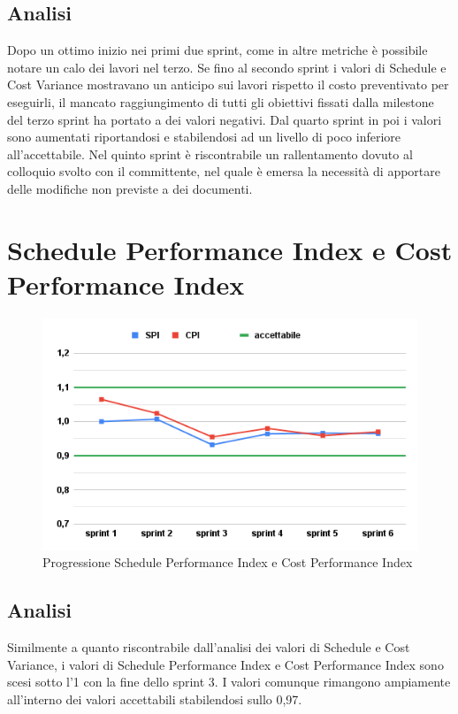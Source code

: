 \subsection{Analisi}
Dopo un ottimo inizio nei primi due sprint, come in altre metriche è possibile notare un calo dei lavori nel terzo. Se fino al secondo sprint i valori di Schedule e Cost Variance mostravano un anticipo sui lavori rispetto il costo preventivato per eseguirli, il mancato raggiungimento di tutti gli obiettivi fissati dalla milestone del terzo sprint ha portato a dei valori negativi. Dal quarto sprint in poi i valori sono aumentati riportandosi e stabilendosi ad un livello di poco inferiore all'accettabile. Nel quinto sprint è riscontrabile un rallentamento dovuto al colloquio svolto con il committente, nel quale è emersa la necessità di apportare delle modifiche non previste a dei documenti.

\section{Schedule Performance Index e Cost Performance Index}
\begin{figure}[H]
    \centering
    \includegraphics[width=0.8\linewidth]{SPICPI.png}
    \caption{Progressione Schedule Performance Index e Cost Performance Index}
\end{figure}
\subsection{Analisi}
Similmente a quanto riscontrabile dall'analisi dei valori di Schedule e Cost Variance, i valori di Schedule Performance Index e Cost Performance Index sono scesi sotto l'1 con la fine dello sprint 3. I valori comunque rimangono ampiamente all'interno dei valori accettabili stabilendosi sullo 0,97.

